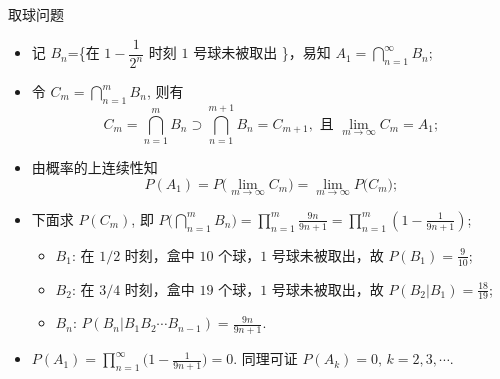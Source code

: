\documentclass[Prob-All.tex]{subfiles}
\begin{document}
\begin{frame}{取球问题}
	\begin{itemize}[<+-|alert@+>]
	\item 记 $B_n$=\{在 $1-\dfrac{1}{2^n}$ 时刻 $1$ 号球未被取出 \}，\pause 易知 $A_1=\bigcap\limits_{n=1}^{\infty} B_n$;\pause
	\item 令 $C_m=\bigcap\limits_{n=1}^{m} B_n$, 则有 \pause
	\[C_m=\bigcap\limits_{n=1}^{m} B_n\supset\bigcap\limits_{n=1}^{m+1} B_n=C_{m+1},\mbox{ 且 } \lim_{m\rightarrow\infty} C_m=A_1;\]\pause
	\item 由概率的上连续性知 $$ P (A_1)= P\big (\lim_{m\rightarrow\infty} C_m\big)=\lim_{m\rightarrow\infty} P\big (C_m\big);$$
	\item 下面求 $P (C_m)$, 即 $P\big (\bigcap_{n=1}^{m} B_n\big)=\prod_{n=1}^{m}\frac{9n}{9n+1}=\prod_{n=1}^{m}\left (1-\frac{1}{9n+1}\right)$;
	\begin{itemize}[<+-|alert@+>]
		\item $B_1$: 在 $1/2$ 时刻，盒中 $10$ 个球，$1$ 号球未被取出，故 \pause $ P (B_1)=\frac{9}{10}$;\pause
		\item $B_2$: 在 $3/4$ 时刻，盒中 $19$ 个球，$1$ 号球未被取出，故 \pause $ P (B_2|B_1)=\frac{18}{19}$;\pause
		\item $B_n$: $ P(B_n|B_1B_2\cdots B_{n-1})=\frac{9n}{9n+1}.$
	\end{itemize}
\item $ P (A_1)=\prod_{n=1}^{\infty}\big (1-\frac{1}{9n+1}\big)=0.$ 同理可证 $ P (A_k)=0,\,k=2,3,\cdots$.
\end{itemize} %



\end{frame}
\end{document}
